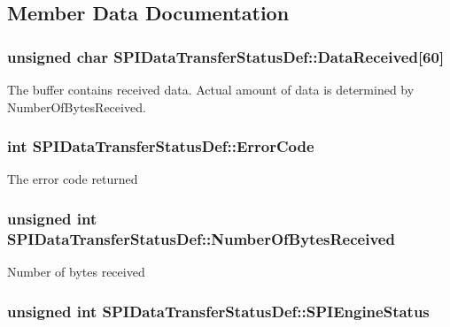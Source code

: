 \subsection{\-Member \-Data \-Documentation}
\hypertarget{struct_s_p_i_data_transfer_status_def_a6376a62c46b37059a74995cc4ba567b3}{
\subsubsection[{\-Data\-Received}]{\setlength{\rightskip}{0pt plus 5cm}unsigned char {\bf \-S\-P\-I\-Data\-Transfer\-Status\-Def\-::\-Data\-Received}\mbox{[}60\mbox{]}}}\label{struct_s_p_i_data_transfer_status_def_a6376a62c46b37059a74995cc4ba567b3}
\-The buffer contains received data. \-Actual amount of data is determined by \-Number\-Of\-Bytes\-Received. \hypertarget{struct_s_p_i_data_transfer_status_def_a202e947d5055ae583859ab2b1dddaede}{
\subsubsection[{\-Error\-Code}]{\setlength{\rightskip}{0pt plus 5cm}int {\bf \-S\-P\-I\-Data\-Transfer\-Status\-Def\-::\-Error\-Code}}}\label{struct_s_p_i_data_transfer_status_def_a202e947d5055ae583859ab2b1dddaede}
\-The error code returned \hypertarget{struct_s_p_i_data_transfer_status_def_a98b49f5e7b7da8d8785c3d4a98a67449}{
\subsubsection[{\-Number\-Of\-Bytes\-Received}]{\setlength{\rightskip}{0pt plus 5cm}unsigned int {\bf \-S\-P\-I\-Data\-Transfer\-Status\-Def\-::\-Number\-Of\-Bytes\-Received}}}\label{struct_s_p_i_data_transfer_status_def_a98b49f5e7b7da8d8785c3d4a98a67449}
\-Number of bytes received \hypertarget{struct_s_p_i_data_transfer_status_def_a4a2227f2a2c87291d918a9a3f39c5d55}{
\subsubsection[{\-S\-P\-I\-Engine\-Status}]{\setlength{\rightskip}{0pt plus 5cm}unsigned int {\bf \-S\-P\-I\-Data\-Transfer\-Status\-Def\-::\-S\-P\-I\-Engine\-Status}}}\label{struct_s_p_i_data_transfer_status_def_a4a2227f2a2c87291d918a9a3f39c5d55}
